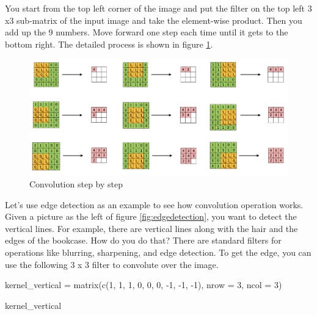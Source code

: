 \documentclass[
  12pt,
]{krantz}
\makeatletter
\newenvironment{Shaded}{\begin{snugshade}}{\end{snugshade}}
\newcommand{\AttributeTok}[1]{\textcolor[rgb]{0.61,0.61,0.61}{#1}}
\newcommand{\DecValTok}[1]{\textcolor[rgb]{0.06,0.06,0.06}{#1}}
\newcommand{\FunctionTok}[1]{\textcolor[rgb]{0,0,0}{#1}}
\newcommand{\NormalTok}[1]{#1}
\newcommand{\OtherTok}[1]{\textcolor[rgb]{0.37,0.37,0.37}{#1}}
\newcommand{\SpecialCharTok}[1]{\textcolor[rgb]{0,0,0}{#1}}
\newenvironment{kframe}{%
\medskip{}
\setlength{\fboxsep}{.8em}
 \def\at@end@of@kframe{}%
 \ifinner\ifhmode%
  \def\at@end@of@kframe{\end{minipage}}%
  \begin{minipage}{\columnwidth}%
 \fi\fi%
 \def\FrameCommand##1{\hskip\@totalleftmargin \hskip-\fboxsep
 \colorbox{shadecolor}{##1}\hskip-\fboxsep
     \hskip-\linewidth \hskip-\@totalleftmargin \hskip\columnwidth}%
 \MakeFramed {\advance\hsize-\width
   \@totalleftmargin\z@ \linewidth\hsize
   \@setminipage}}%
 {\par\unskip\endMakeFramed%
 \at@end@of@kframe}
\renewenvironment{Shaded}{\begin{kframe}}{\end{kframe}}
\makeatother
\begin{document}
You start from the top left corner of the image and put the filter on the top left 3 x3 sub-matrix of the input image and take the element-wise product. Then you add up the 9 numbers. Move forward one step each time until it gets to the bottom right. The detailed process is shown in figure \ref{fig:convolutionsbs}.

\begin{figure}

{\centering \includegraphics[width=0.8\linewidth]{images/convolutionsbs} 

}

\caption{Convolution step by step}\label{fig:convolutionsbs}
\end{figure}

Let's use edge detection as an example to see how convolution operation works. Given a picture as the left of figure \ref{fig:edgedetection}, you want to detect the vertical lines. For example, there are vertical lines along with the hair and the edges of the bookcase. How do you do that? There are standard filters for operations like blurring, sharpening, and edge detection. To get the edge, you can use the following 3 x 3 filter to convolute over the image.

\begin{Shaded}
\begin{Highlighting}[]
\NormalTok{kernel\_vertical }\OtherTok{=} \FunctionTok{matrix}\NormalTok{(}\FunctionTok{c}\NormalTok{(}\DecValTok{1}\NormalTok{, }\DecValTok{1}\NormalTok{, }\DecValTok{1}\NormalTok{, }\DecValTok{0}\NormalTok{, }\DecValTok{0}\NormalTok{, }\DecValTok{0}\NormalTok{, }\SpecialCharTok{{-}}\DecValTok{1}\NormalTok{, }\SpecialCharTok{{-}}\DecValTok{1}\NormalTok{, }\SpecialCharTok{{-}}\DecValTok{1}\NormalTok{),}
\AttributeTok{nrow =} \DecValTok{3}\NormalTok{, }\AttributeTok{ncol =} \DecValTok{3}\NormalTok{)}

\NormalTok{kernel\_vertical}
\end{Highlighting}
\end{Shaded}
\end{document}
